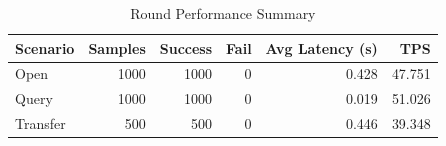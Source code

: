 \begin{table}
\caption{Round Performance Summary}
\label{tab:round_perf}
\begin{tabular}{lrrrrr}
\toprule
Scenario & Samples & Success & Fail & Avg Latency (s) & TPS \\
\midrule
Open & 1000 & 1000 & 0 & 0.428 & 47.751 \\
Query & 1000 & 1000 & 0 & 0.019 & 51.026 \\
Transfer & 500 & 500 & 0 & 0.446 & 39.348 \\
\bottomrule
\end{tabular}
\end{table}
